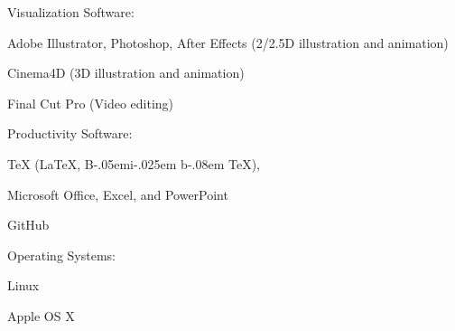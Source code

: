 \documentclass[10pt]{article}
\newcommand{\halfblankline}{\quad\vspace{-0.5\baselineskip}\pagebreak[3]}
\providecommand\BibTeX{{B\kern-.05em{\sc i\kern-.025em b}\kern-.08em \TeX}}
\begin{document}
	\halfblankline

	Visualization Software:
	
	\begin{innerlist}
		\item Adobe Illustrator, Photoshop, After Effects (2/2.5D illustration and animation)
		\item Cinema4D (3D illustration and animation)
		\item Final Cut Pro (Video editing)
	\end{innerlist}

	\halfblankline
	
	Productivity Software:
	
	\begin{innerlist}
		
		\item \TeX{} (\LaTeX{}, \BibTeX{}),
		\item Microsoft Office, Excel, and PowerPoint
		\item GitHub

	\end{innerlist}
	
	\halfblankline
	
	Operating Systems:
	
	\begin{innerlist}
		\item Linux
		\item Apple OS X
	\end{innerlist}
	
	\halfblankline
	
	
\end{document}
